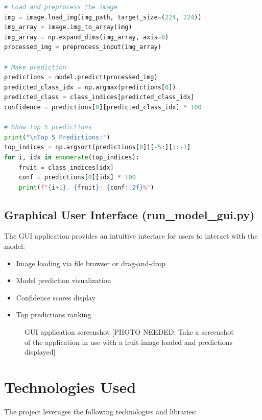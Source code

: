 \documentclass[11pt,a4paper]{report}
\begin{document}
\begin{lstlisting}[language=Python, caption=Key sections of the prediction module]
# Load and preprocess the image
img = image.load_img(img_path, target_size=(224, 224))
img_array = image.img_to_array(img)
img_array = np.expand_dims(img_array, axis=0)
processed_img = preprocess_input(img_array)

# Make prediction
predictions = model.predict(processed_img)
predicted_class_idx = np.argmax(predictions[0])
predicted_class = class_indices[predicted_class_idx]
confidence = predictions[0][predicted_class_idx] * 100

# Show top 5 predictions
print("\nTop 5 Predictions:")
top_indices = np.argsort(predictions[0])[-5:][::-1]
for i, idx in enumerate(top_indices):
    fruit = class_indices[idx]
    conf = predictions[0][idx] * 100
    print(f"{i+1}. {fruit}: {conf:.2f}%")
\end{lstlisting}

\subsection{Graphical User Interface (run\_model\_gui.py)}
The GUI application provides an intuitive interface for users to interact with the model:

\begin{itemize}
    \item Image loading via file browser or drag-and-drop
    \item Model prediction visualization
    \item Confidence scores display
    \item Top predictions ranking
\end{itemize}

\begin{figure}[H]
    \centering
    \fbox{\rule{0pt}{10cm}\rule{12cm}{0pt}}
    \caption{GUI application screenshot [PHOTO NEEDED: Take a screenshot of the application in use with a fruit image loaded and predictions displayed]}
    \label{fig:gui_screenshot}
\end{figure}

\section{Technologies Used}
The project leverages the following technologies and libraries:
\end{document}
